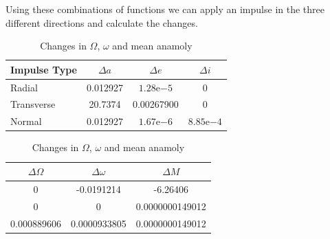 \documentclass[12pt,twocolumn]{article}  %
\begin{document}
Using these combinations of functions we can apply an impulse in the three different directions and calculate the changes.
\begin{table}[h]
    \centering
    \begin{minipage}{0.48\textwidth} %
        \centering
        \small
        \setlength{\tabcolsep}{4pt}
        \renewcommand{\arraystretch}{1.1}
        \begin{tabular}{lccc}
        \hline
        Impulse Type & $\Delta a$ & $\Delta e$ & $\Delta i$ \\
        \hline
        Radial     & 0.012927 & $1.28\mathrm{e}{-5}$ & 0 \\
        Transverse & 20.7374  & 0.00267900   & 0 \\
        Normal     & 0.012927 & $1.67\mathrm{e}{-6}$ & $8.85\mathrm{e}{-4}$ \\
        \hline
        \end{tabular}
        \caption{Changes in the semi-major axis, eccentricity and inclination}
    \end{minipage}
    \hfill
    \begin{minipage}{0.48\textwidth} %
        \centering
        \small
        \setlength{\tabcolsep}{4pt}
        \renewcommand{\arraystretch}{1.1}
        \begin{tabular}{ccc}
        \hline
        $\Delta \Omega$ & $\Delta \omega$ & $\Delta M$ \\
        \hline
        0 & -0.0191214 & -6.26406 \\
        0 & 0 & 0.0000000149012 \\
        0.000889606 & 0.0000933805 & 0.0000000149012 \\
        \hline
        \end{tabular}
        \caption{Changes in $\Omega$, $\omega$ and mean anamoly}
    \end{minipage}
\end{table}

    
\end{document}
